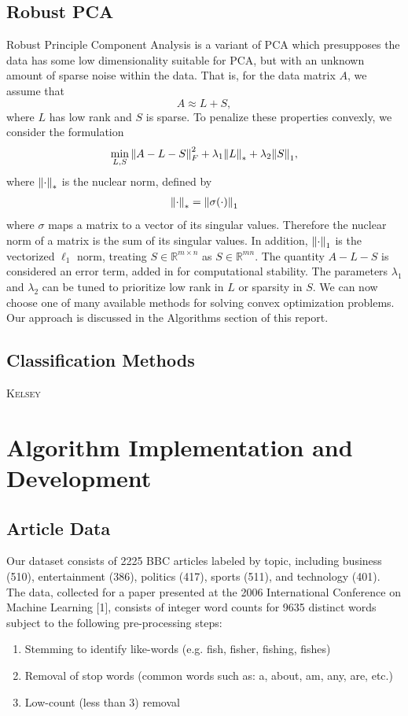 \documentclass[12pt]{article}
\newcommand{\R}{\mathbb{R}}
\newcommand{\comment}[1]{\textsc{\color[rgb]{1,0,0}#1}}
\begin{document}
\subsection{Robust PCA}
Robust Principle Component Analysis is a variant of PCA which presupposes the data has some low dimensionality suitable for PCA, but with an unknown amount of sparse noise within the data. That is, for the data matrix $A$, we assume that 
$$  A \approx L + S,$$
where $L$ has low rank and $S$ is sparse. To penalize these properties convexly, we consider the formulation
\begin{align}
\min_{L,S} \norm{A-L-S}_{F}^2 + \lambda_1 \norm{L}_* + \lambda_2 \norm{S}_1,
\label{eq:robust_obj}
\end{align}
where $\norm{\cdot}_*$ is the nuclear norm, defined by
\begin{align*}
\norm{\cdot}_* = \norm{\sigma(\cdot)}_1
\end{align*}
where $\sigma$ maps a matrix to a vector of its singular values. Therefore the nuclear norm of a matrix is the sum of its singular values. In addition, $\norm{\cdot}_1$ is the vectorized $\ell_1$ norm, treating $S \in \R^{m \times n}$ as $S \in \R^{mn}.$ The quantity $A - L - S$ is considered an error term, added in for computational stability. The parameters $\lambda_1$ and $\lambda_2$ can be tuned to prioritize low rank in $L$ or sparsity in $S.$ We can now choose one of many available methods for solving convex optimization problems. Our approach is discussed in the Algorithms section of this report. 


\subsection{Classification Methods}
\comment{Kelsey}
\section{Algorithm Implementation and Development}

\subsection{Article Data}

Our dataset consists of 2225 BBC articles labeled by topic, including business (510), entertainment (386), politics (417), sports (511), and technology (401). The data, collected for a paper presented at the 2006 International Conference on Machine Learning [1], consists of integer word counts for 9635 distinct words subject to the following pre-processing steps:
\begin{enumerate}
\item Stemming to identify like-words (e.g. fish, fisher, fishing, fishes)
\item Removal of stop words (common words such as: a, about, am, any, are, etc.)
\item Low-count (less than 3) removal
\end{enumerate}
\end{document}
